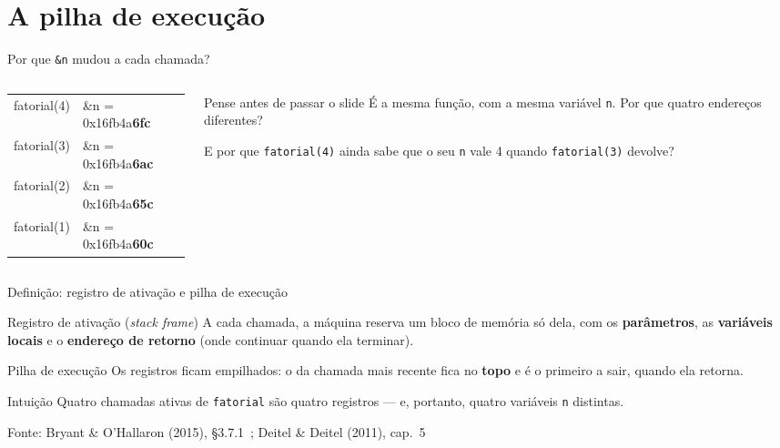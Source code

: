 \documentclass[aspectratio=169]{beamer}
\newcommand{\fonte}[1]{\vfill\hfill{\scriptsize\textcolor{UFSGray}{Fonte: #1}}}
\begin{document}
\section{A pilha de execução}

\begin{frame}{Por que \texttt{\&n} mudou a cada chamada?}
  \begin{columns}[c]
    \begin{column}{0.5\textwidth}
      \begin{center}
        \ttfamily\scriptsize
        \begin{tabular}{ll}
          fatorial(4) & \&n = 0x16fb4a\textbf{6fc}\\
          fatorial(3) & \&n = 0x16fb4a\textbf{6ac}\\
          fatorial(2) & \&n = 0x16fb4a\textbf{65c}\\
          fatorial(1) & \&n = 0x16fb4a\textbf{60c}
        \end{tabular}
      \end{center}
    \end{column}
    \begin{column}{0.46\textwidth}
      \begin{block}{Pense antes de passar o slide}
        \small
        É a mesma função, com a mesma variável \texttt{n}. Por que quatro
        endereços diferentes?

        \medskip
        E por que \texttt{fatorial(4)} ainda sabe que o seu \texttt{n} vale
        4 quando \texttt{fatorial(3)} devolve?
      \end{block}
    \end{column}
  \end{columns}
\end{frame}

\begin{frame}{Definição: registro de ativação e pilha de execução}
  \begin{block}{Registro de ativação (\emph{stack frame})}
    \small A cada chamada, a máquina reserva um bloco de memória só dela, com
    os \textbf{parâmetros}, as \textbf{variáveis locais} e o
    \textbf{endereço de retorno} (onde continuar quando ela terminar).
  \end{block}
  \begin{block}{Pilha de execução}
    \small Os registros ficam empilhados: o da chamada mais recente fica no
    \textbf{topo} e é o primeiro a sair, quando ela retorna.
  \end{block}
  \begin{exampleblock}{Intuição}
    \small Quatro chamadas ativas de \texttt{fatorial} são quatro registros
    --- e, portanto, quatro variáveis \texttt{n} distintas.
  \end{exampleblock}
  \fonte{Bryant \& O'Hallaron (2015), §3.7.1~\cite{bryant2015computer};
    Deitel \& Deitel (2011), cap.~5~\cite{deitel2011como}}
\end{frame}
\end{document}
